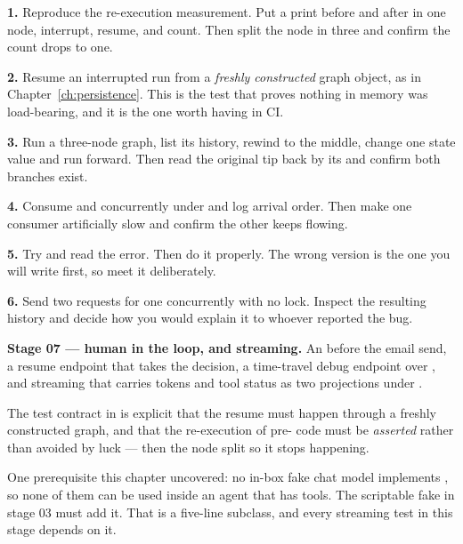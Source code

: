\begin{exercisebox}
\textbf{1.} Reproduce the re-execution measurement. Put a print before and after
 in one node, interrupt, resume, and count. Then split the node in
three and confirm the count drops to one.

\textbf{2.} Resume an interrupted run from a \emph{freshly constructed} graph
object, as in Chapter~\ref{ch:persistence}. This is the test that proves nothing
in memory was load-bearing, and it is the one worth having in CI.

\textbf{3.} Run a three-node graph, list its history, rewind to the middle,
change one state value and run forward. Then read the original tip back by its
 and confirm both branches exist.

\textbf{4.} Consume  and  concurrently under
 and log arrival order. Then make one consumer artificially slow and
confirm the other keeps flowing.

\textbf{5.} Try  and read the error. Then do it properly.
The wrong version is the one you will write first, so meet it deliberately.

\textbf{6.} Send two requests for one  concurrently with no
lock. Inspect the resulting history and decide how you would explain it to
whoever reported the bug.
\end{exercisebox}

\begin{projectbox}
\textbf{Stage 07 --- human in the loop, and streaming.} An  before
the email send, a resume endpoint that takes the decision, a time-travel debug
endpoint over , and streaming that carries tokens and
tool status as two projections under .

The test contract in  is explicit that
the resume must happen through a freshly constructed graph, and that the
re-execution of pre- code must be \emph{asserted} rather than
avoided by luck --- then the node split so it stops happening.

One prerequisite this chapter uncovered: no in-box fake chat model implements
, so none of them can be used inside an agent that has tools.
The scriptable fake in stage 03 must add it. That is a five-line subclass, and
every streaming test in this stage depends on it.
\end{projectbox}
